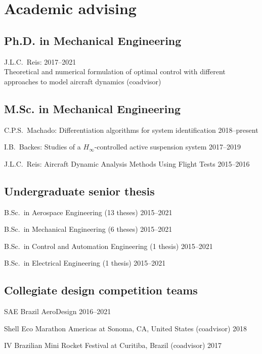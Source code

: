 \documentclass[a4paper, 11pt, oneside]{memoir}
\begin{document}
\section{Academic advising}
\subsection{Ph.D. in Mechanical Engineering}
\begin{description}
\item {\textnormal{J.L.C.~Reis}}:
\hfill 2017--2021\\
Theoretical and numerical formulation of optimal control with different
approaches to model aircraft dynamics (coadvisor)
\end{description}

\subsection{M.Sc. in Mechanical Engineering}
\begin{description}
\item{\textnormal{C.P.S.~Machado:}} 
{Differentiation algorithms for system identification}
\hfill{2018--present}

\item {\textnormal{I.B.~Backes}}:
  {Studies of a $H_\infty$-controlled active suspension system}{}{}{}
  \hfill {2017--2019}

\item {\textnormal{J.L.C.~Reis}}:
  {Aircraft Dynamic Analysis Methods Using Flight Tests}{}{}{}
  \hfill {2015--2016}
\end{description}

\subsection{Undergraduate senior thesis}
\begin{description}
\item
  B.Sc.~in Aerospace Engineering (13 theses) \hfill {2015--2021}
\item
  B.Sc.~in Mechanical Engineering (6 theses) \hfill {2015--2021}
\item
  B.Sc.~in Control and Automation Engineering (1 thesis) \hfill {2015--2021} 
\item
  B.Sc.~in Electrical Engineering (1 thesis) \hfill {2015--2021} 
\end{description}

\subsection{Collegiate design competition teams}
\begin{description}
\item {SAE Brazil AeroDesign} \hfill 2016--2021
\item
{Shell Eco Marathon Americas at Sonoma, CA, United States (coadvisor)}
\hfill {2018}%
\item {IV Brazilian Mini Rocket Festival at Curitiba, Brazil (coadvisor)}
  \hfill {2017}
\end{description}
\end{document}

